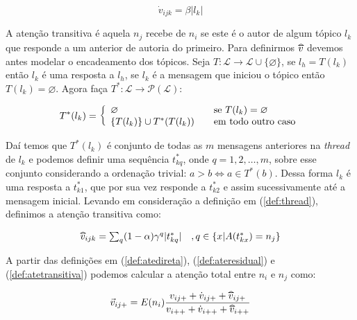 \documentclass{article}
\begin{document}
\begin{equation}
\label{def:ateresidual}
\dot{v}_{ijk} = \beta |l_k|
\end{equation}

A atenção transitiva é aquela $n_j$ recebe de $n_i$ se este é o autor de algum
tópico $l_k$ que responde a um anterior de autoria do primeiro. Para definirmos
$\widetriangle{v}$ devemos antes modelar o encadeamento dos tópicos. Seja
$T:\mathscr{L}\to \mathscr{L}\cup\{\varnothing\}$, se $l_h=T(l_k)$ então
$l_k$ é uma resposta a $l_h$, se $l_k$ é a mensagem que iniciou o tópico então
$T(l_k)=\varnothing$. Agora faça $T^*:\mathscr{L}\to\mathscr{P}(\mathscr{L})$:

\begin{equation}
\label{def:thread}
T^*(l_k) = \left\{ \begin{array}{l l} \varnothing &\quad\text{se
$T(l_k)=\varnothing$}\\ \{T(l_k)\} \cup T^*(T(l_k)) &\quad\text{em todo outro
caso}\end{array} \right.
\end{equation}

Daí temos que $T^*(l_k)$ é conjunto de todas as $m$ mensagens anteriores na
\textit{thread} de $l_k$ e podemos definir uma sequência $t^*_{kq}$, onde
$q=1,2,\ldots,m$, sobre esse conjunto considerando a ordenação trivial: $a > b
\iff a\in T^*(b)$. Dessa forma $l_k$ é uma resposta a $t^*_{k1}$, que por sua
vez responde a $t^*_{k2}$ e assim sucessivamente até a mensagem inicial. Levando em
consideração a definição em (\ref{def:thread}), definimos a atenção transitiva
como:

\begin{equation}
\label{def:atetransitiva}
\begin{array}{ l l }
\widetriangle{v}_{ijk} = \sum_{q}(1-\alpha)\gamma^q|t^*_{kq}| 
&, q \in \{x | A(t^*_{kx}) = n_j\}
\end{array}
\end{equation}

A partir das definições em (\ref{def:atedireta}), (\ref{def:ateresidual}) e
(\ref{def:atetransitiva}) podemos calcular a atenção total entre $n_i$ e $n_j$
como:

\begin{equation}
\label{def:atetotal}
\vec{v}_{ij+} = E(n_i)\frac{v_{ij+} + \dot{v}_{ij+} +
\widetriangle{v}_{ij+}}{v_{i++} + \dot{v}_{i++} + \widetriangle{v}_{i++}}
\end{equation}
\end{document}

